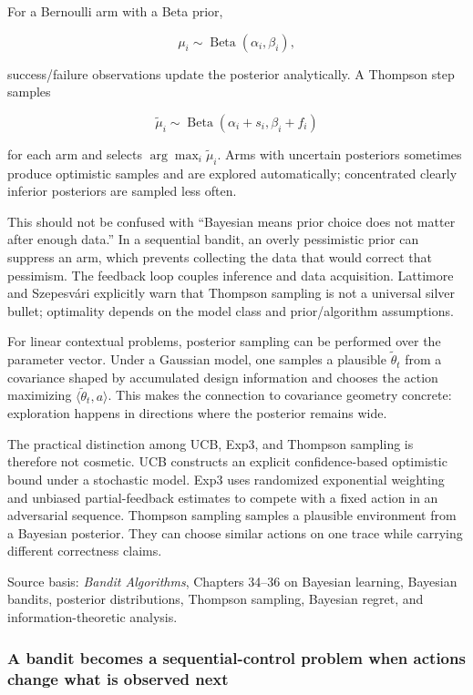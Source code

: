 For a Bernoulli arm with a Beta prior,

\[
\mu_i\sim\operatorname{Beta}(\alpha_i,\beta_i),
\]

success/failure observations update the posterior analytically. A Thompson step samples

\[
\tilde\mu_i\sim
\operatorname{Beta}(\alpha_i+s_i,\beta_i+f_i)
\]

for each arm and selects \(\arg\max_i\tilde\mu_i\). Arms with uncertain posteriors sometimes produce optimistic samples and are explored automatically; concentrated clearly inferior posteriors are sampled less often.

This should not be confused with ``Bayesian means prior choice does not matter after enough data.'' In a sequential bandit, an overly pessimistic prior can suppress an arm, which prevents collecting the data that would correct that pessimism. The feedback loop couples inference and data acquisition. Lattimore and Szepesvári explicitly warn that Thompson sampling is not a universal silver bullet; optimality depends on the model class and prior/algorithm assumptions.

For linear contextual problems, posterior sampling can be performed over the parameter vector. Under a Gaussian model, one samples a plausible \(\tilde\theta_t\) from a covariance shaped by accumulated design information and chooses the action maximizing \(\langle \tilde\theta_t,a\rangle\). This makes the connection to covariance geometry concrete: exploration happens in directions where the posterior remains wide.

The practical distinction among UCB, Exp3, and Thompson sampling is therefore not cosmetic. UCB constructs an explicit confidence-based optimistic bound under a stochastic model. Exp3 uses randomized exponential weighting and unbiased partial-feedback estimates to compete with a fixed action in an adversarial sequence. Thompson sampling samples a plausible environment from a Bayesian posterior. They can choose similar actions on one trace while carrying different correctness claims.

Source basis: \emph{Bandit Algorithms}, Chapters 34--36 on Bayesian learning, Bayesian bandits, posterior distributions, Thompson sampling, Bayesian regret, and information-theoretic analysis.

\subsubsection{A bandit becomes a sequential-control problem when actions change what is observed next}\label{02-foundations-ii-ch029-a-bandit-becomes-a-sequential-control-problem-when-actions-change-what-is-observed-next}

